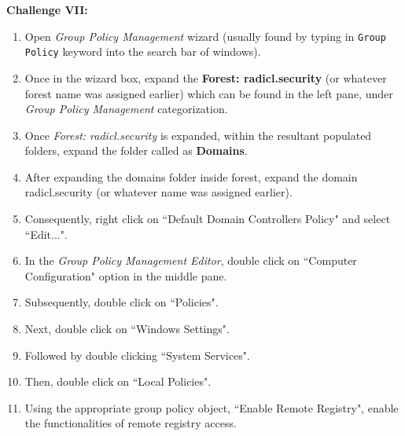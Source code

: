 \documentclass[12pt]{extarticle}
\newcommand{\ben}{\begin{enumerate}}
\newcommand{\een}{\end{enumerate}}
\begin{document}
		
		\vspace{4mm}
		\item \textbf{Challenge VII:}
		\ben
			\item Open \textit{Group Policy Management} wizard (usually found by typing in \texttt{Group Policy} keyword into the search bar of windows).
			\item Once in the wizard box, expand the \textbf{Forest: radicl.security} (or whatever forest name was assigned earlier) which can be found in the left pane, under \textit{Group Policy Management} categorization.
			\item Once \textit{Forest: radicl.security} is expanded, within the resultant populated folders, expand the folder called as \textbf{Domains}.
			\item After expanding the domains folder inside forest, expand the domain radicl.security (or whatever name was assigned earlier).
			\item Consequently, right click on ``Default Domain Controllers Policy" and select ``Edit...".
			\item In the \textit{Group Policy Management Editor}, double click on ``Computer Configuration" option in the middle pane.
			\item Subsequently, double click on ``Policies".
			\item Next, double click on ``Windows Settings".
			\item Followed by double clicking ``System Services".
			\item Then, double click on ``Local Policies".
			\item Using the appropriate group policy object, ``Enable Remote Registry", enable the functionalities of remote registry access.
		\een
		
\end{document}
